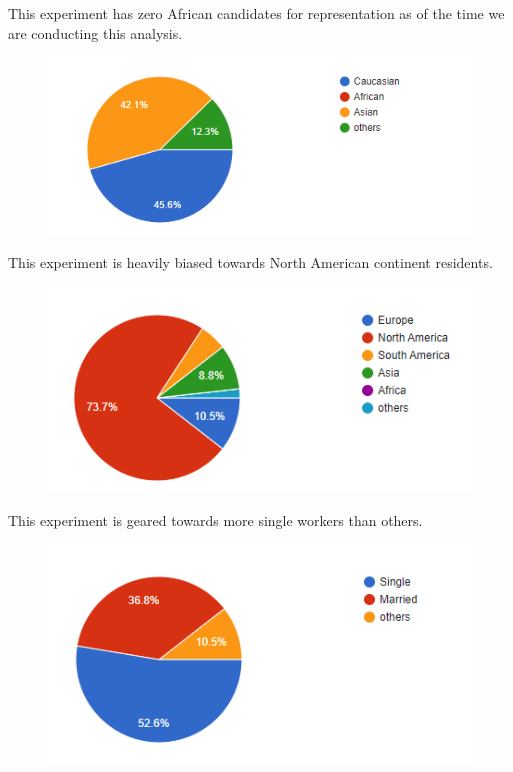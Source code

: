 \documentclass[12pt]{article}
\begin{document}
This experiment has zero African candidates for representation as of the time we are conducting this analysis. 
\begin{figure}[h]
    \centering
    \includegraphics[scale=1]{bias_race.png}
    \label{bias_race}
\end{figure} 

This experiment is heavily biased towards North American continent residents.
\begin{figure}[H]
    \centering
    \includegraphics[scale=1]{bias_na.png}
    \label{bias_na}
\end{figure} 

This experiment is geared towards more single workers than others.
\begin{figure}[h]
    \centering
    \includegraphics[scale=1]{bias_marriage.png}
    \label{bias_marriage}
\end{figure} 
\end{document}
